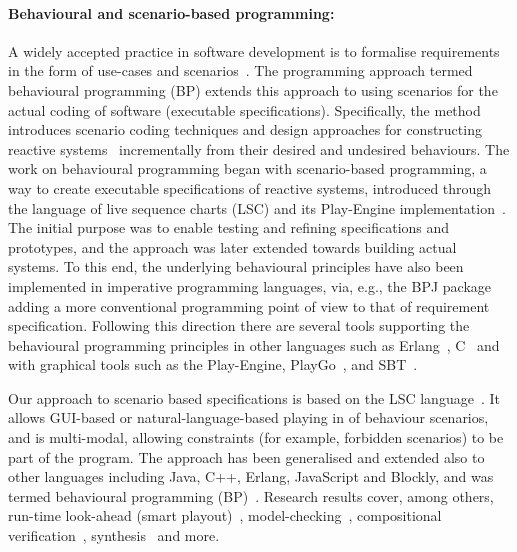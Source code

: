 \documentclass[11pt]{article}
\newcounter{example}
\begin{document}
\paragraph{Behavioural and scenario-based programming:} A widely accepted practice in software development is to formalise requirements in the form of use-cases and scenarios~\cite{Sutcliffe2003}. The programming approach termed behavioural programming (BP) extends this approach to using scenarios for the actual coding of software (executable specifications). Specifically, the method introduces scenario coding techniques and design approaches for constructing reactive systems~\cite{Harel1998} incrementally from their desired and undesired behaviours. The work on behavioural programming began with scenario-based programming, a way to create executable specifications of reactive systems, introduced through the language of live sequence charts (LSC) and its Play-Engine implementation~\cite{Damm2001,Marelly2002}. The initial purpose was to enable testing and refining specifications and prototypes, and the approach was later extended towards building actual systems. To this end, the underlying behavioural principles have also been implemented in imperative programming languages, via, e.g., the BPJ package~\cite{Harel2010} adding a more conventional programming point of view to that of requirement specification. Following this direction there are several tools supporting the behavioural programming principles in other languages such as Erlang~\cite{wiener2010coordinating}, C~\cite{katz2013module}  and with graphical tools such as the Play-Engine, PlayGo~\cite{Harel2010a}, and SBT~\cite{Greenyer2016}.

Our approach to scenario based specifications is based on the LSC language~\cite{Damm2001}. It allows GUI-based or natural-language-based playing in of behaviour scenarios, and is multi-modal, allowing constraints (for example, forbidden scenarios) to be part of the program. The approach has been generalised and extended also to other languages including Java, C++, Erlang, JavaScript and Blockly, and was termed behavioural programming (BP)~\cite{Harel2010}. Research results cover, among others, run-time look-ahead (smart playout)~\cite{Harel2002}, model-checking~\cite{Harel2011}, compositional verification~\cite{Harel2013}, synthesis~\cite{segall2011synthesis} and more.
\end{document}
